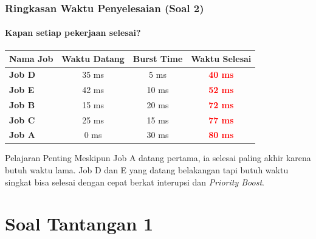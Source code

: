\documentclass[t,aspectratio=169,xcolor=dvipsnames]{beamer}
\newcommand{\tem}[1]{\textbf{\textcolor{red}{#1}}}
\begin{document}
\begin{frame}
    \frametitle{Ringkasan Waktu Penyelesaian (Soal 2)}
    \framesubtitle{Kapan setiap pekerjaan selesai?}
    \footnotesize
    \begin{table}[]
        \centering
        \begin{tabular}{lccc}
            \toprule
            \textbf{Nama Job} & \textbf{Waktu Datang} & \textbf{Burst Time} & \textbf{Waktu Selesai} \\
            \midrule
            \textbf{Job D} & 35 ms & 5 ms & \tem{40 ms} \\
            \textbf{Job E} & 42 ms & 10 ms & \tem{52 ms} \\
            \textbf{Job B} & 15 ms & 20 ms & \tem{72 ms} \\
            \textbf{Job C} & 25 ms & 15 ms & \tem{77 ms} \\
            \textbf{Job A} & 0 ms & 30 ms & \tem{80 ms} \\
            \bottomrule
        \end{tabular}
    \end{table}
    \vspace{0.1cm}
    \begin{alertblock}{Pelajaran Penting}
        Meskipun Job A datang pertama, ia selesai paling akhir karena butuh waktu lama. Job D dan E yang datang belakangan tapi butuh waktu singkat bisa selesai dengan cepat berkat interupsi dan \textit{Priority Boost}.
    \end{alertblock}
\end{frame}

\section{Soal Tantangan 1}
\end{document}
